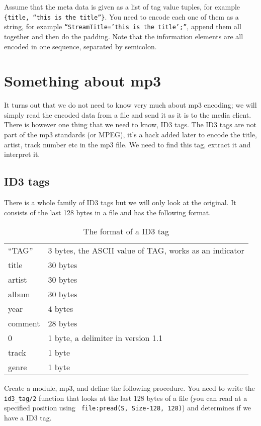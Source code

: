 \documentclass[a4paper,dvips,11pt]{article}
\begin{document}
Assume that the meta data is given as a list of tag value tuples, for
example {\tt \{title, ``this is the title''\}}. You need to encode
each one of them as a string, for example {\tt ``StreamTitle='this is
  the title';''}, append them all together and then do the
padding. Note that the information elements are all encoded in one
sequence, separated by semicolon.


\section{Something about mp3}

It turns out that we do not need to know very much about mp3 encoding;
we will simply read the encoded data from a file and send it as it is
to the media client. There is however one thing that we need to know,
ID3 tags. The ID3 tags are not part of the mp3 standards (or MPEG),
it's a hack added later to encode the title, artist, track number etc
in the mp3 file. We need to find this tag, extract it and interpret
it.

\subsection{ID3 tags}

There is a whole family of ID3 tags but we will only look at the
original. It consists of the last 128 bytes in a file and has the
following format.

\begin{table}[center]
\begin{tabular}{|l|l|}
``TAG'' & 3 bytes, the ASCII value of TAG, works as an indicator\\
title& 30 bytes\\
artist& 30 bytes\\
album& 30 bytes\\
year& 4 bytes\\
comment& 28 bytes\\
0& 1 byte, a delimiter in version 1.1\\
track & 1 byte \\
genre & 1 byte \\
\end{tabular}
\caption{The format of a ID3 tag}
\end{table}

Create a module, mp3, and define the following procedure. You need to
write the {\tt id3\_tag/2} function that looks at the last 128 bytes
of a file (you can read at a specified position using {\tt
  file:pread(S, Size-128, 128)}) and determines if we have a ID3
tag. 
\end{document}
